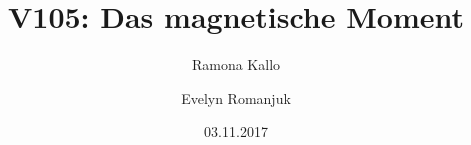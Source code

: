 


\title{V105: Das magnetische Moment}
\author{Ramona Kallo \and Evelyn Romanjuk}
\date{03.11.2017}
\maketitle 
\newpage
\tableofcontents
\newpage




\nocite{*}
\printbibliography


